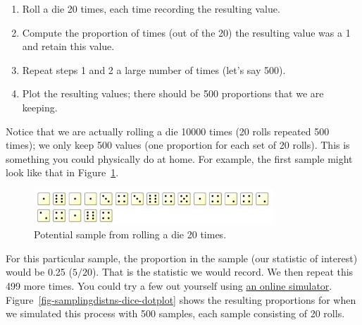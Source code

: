 \documentclass[
  letterpaper,
  DIV=11,
  numbers=noendperiod]{scrreprt}
\providecommand{\tightlist}{%
  \setlength{\itemsep}{0pt}\setlength{\parskip}{0pt}}\usepackage{longtable,booktabs,array}
\theoremstyle{definition}
\theoremstyle{definition}
\theoremstyle{plain}
\theoremstyle{remark}
\begin{document}
\begin{enumerate}
\def\labelenumi{\arabic{enumi}.}
\tightlist
\item
  Roll a die 20 times, each time recording the resulting value.
\item
  Compute the proportion of times (out of the 20) the resulting value
  was a 1 and retain this value.
\item
  Repeat steps 1 and 2 a large number of times (let's say 500).
\item
  Plot the resulting values; there should be 500 proportions that we are
  keeping.
\end{enumerate}

Notice that we are actually rolling a die 10000 times (20 rolls repeated
500 times); we only keep 500 values (one proportion for each set of 20
rolls). This is something you could physically do at home. For example,
the first sample might look like that in
Figure~\ref{fig-samplingdistns-dice-example}.

\begin{figure}

{\centering \includegraphics[width=0.8\textwidth,height=\textheight]{./images/SamplingDistns-Dice-Example.jpg}

}

\caption{\label{fig-samplingdistns-dice-example}Potential sample from
rolling a die 20 times.}

\end{figure}

For this particular sample, the proportion in the sample (our statistic
of interest) would be 0.25 (\(5/20\)). That is the statistic we would
record. We then repeat this 499 more times. You could try a few out
yourself using \href{https://www.random.org/dice/?num=20}{an online
simulator}. Figure~\ref{fig-samplingdistns-dice-dotplot} shows the
resulting proportions for when we simulated this process with 500
samples, each sample consisting of 20 rolls.
\end{document}

